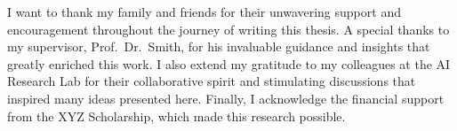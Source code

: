 I want to thank my family and friends for their unwavering support and encouragement 
throughout the journey of writing this thesis. A special thanks to my supervisor, 
Prof.\ Dr.\ Smith, for his invaluable guidance and insights that greatly enriched this work. 
I also extend my gratitude to my colleagues at the AI Research Lab for their collaborative 
spirit and stimulating discussions that inspired many ideas presented here. Finally, I 
acknowledge the financial support from the XYZ Scholarship, which made this research possible.

